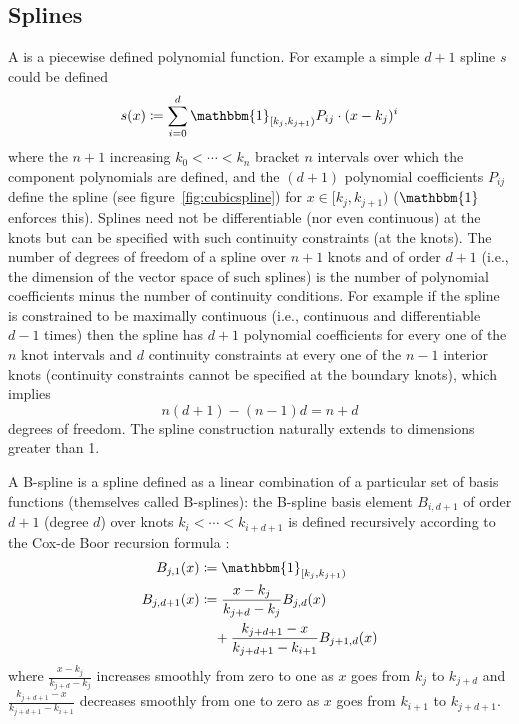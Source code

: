 \subsection{Splines}\label{subsubsec:splines}

A  is a piecewise defined polynomial function. For example a simple  \(d+1\) spline \(s\) could be defined
\[
	s(x) \coloneqq \sum_{i=0}^d \mathbbm{1}_{[k_j, k_{j+1})}P_{ij} \cdot (x - k_j)^i
\]
where the \(n+1\) increasing  \(k_0 < \cdots < k_n\) bracket \(n\) intervals over which the component polynomials are defined, and the \((d+1)\) polynomial coefficients \(P_{ij}\) define the spline (see figure~\ref{fig:cubicspline}) for \(x \in [k_j, k_{j+1})\) (\(\mathbbm{1}\) enforces this).
%
Splines need not be differentiable (nor even continuous) at the knots but can be specified with such continuity constraints (at the knots).
%
The number of degrees of freedom of a spline over \(n+1\) knots and of order \(d+1\) (i.e., the dimension of the vector space of such splines) is the number of polynomial coefficients minus the number of continuity conditions.
%
For example if the spline is constrained to be maximally continuous (i.e., continuous and differentiable \(d-1\) times) then the spline has \(d+1\) polynomial coefficients for every one of the \(n\) knot intervals and \(d\) continuity constraints at every one of the \(n-1\) interior knots (continuity constraints cannot be specified at the boundary knots), which implies
\[
	n(d+1) - (n-1)d = n+d
\]
degrees of freedom. The spline construction naturally extends to dimensions greater than 1.

A B-spline is a spline defined as a linear combination of a particular set of basis functions (themselves called B-splines): the B-spline basis element \(B_{i, d+1}\) of order \(d+1\) (degree \(d\)) over knots \(k_i < \cdots < k_{i+d+1}\) is defined recursively according to the Cox-de Boor recursion formula \cite{de1971subroutine}:
\begin{align}
	B_{j,1} (x)   & \coloneqq \mathbbm{1}_{[k_j, k_{j+1})}                                   \\
	B_{j,d+1} (x) & \coloneqq \frac{x-k_j}{k_{j+d} - k_j} B_{j,d} (x)                        \\
	              & \quad+ \frac{k_{j+d+1} - x}{k_{j+d+1} - k_{i+1}} B_{j+1,d} \nonumber (x)
\end{align}
where \(\frac{x-k_j}{k_{j+d} - k_j}\) increases smoothly from zero to one as \(x\) goes from \(k_j\) to \(k_{j+d}\) and \(\frac{k_{j+d+1} - x}{k_{j+d+1} - k_{i+1}}\) decreases smoothly from one to zero as \(x\) goes from \(k_{i+1}\) to \(k_{j+d+1}\).
%
